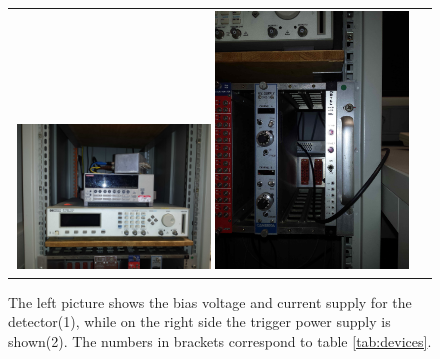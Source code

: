 \documentclass{article}
\begin{document}
\begin{figure}[tbhn]
\begin{center}
\begin{tabular}{cc}
\includegraphics[width=0.49\textwidth]{pictures/CurrentAndVoltage.jpg}
\includegraphics[width=0.49\textwidth]{pictures/Trigger.jpg}
\end{tabular}
\end{center}
\caption{The left picture shows the bias voltage and current supply for the detector(1), while on the right side the trigger power supply is shown(2). The numbers in brackets correspond to table \ref{tab:devices}. }
\label{fig:CurrentAndVoltageTrigger}
\end{figure}
\end{document}
